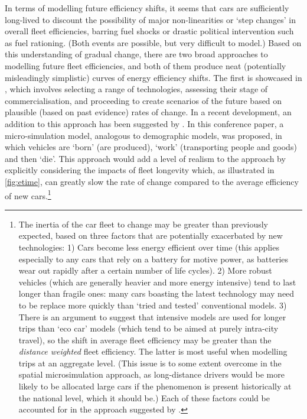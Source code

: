 In terms of modelling future efficiency shifts, it seems that cars are sufficiently
long-lived to discount the possibility of major non-linearities or
`step changes' in overall fleet efficiencies, barring fuel shocks
\citep{Lyons2002} or drastic political intervention such as fuel rationing.
(Both events are possible, but very difficult to model.)
Based on this understanding of gradual change, there
are two broad approaches to modelling future fleet efficiencies, and both
of them produce neat (potentially misleadingly simplistic) curves of energy efficiency
shifts. The first is showcased in \citet{Baptista2012}, which involves selecting
a range of technologies, assessing their stage of commercialisation, and
proceeding to create scenarios of the future based on plausible (based on
past evidence) rates of change. In a recent development, an addition to this
approach has been suggested by \citet{Zuo2013}. In this conference paper,
a micro-simulation model, analogous to demographic models, was proposed,
in which vehicles are `born' (are produced), `work' (transporting people
and goods) and then `die'. This approach would add a level of realism to
the approach by explicitly considering the impacts of fleet longevity which,
as illustrated in \cref{fig:etime}, can greatly slow the rate of change compared
to the average efficiency of new
cars.\footnote{The inertia
of the car fleet to change may be greater than previously expected,
based on three factors that are potentially exacerbated by new technologies:
1) Cars become less energy efficient over time (this applies especially to
any cars that rely on a battery for motive power, as batteries
wear out rapidly after a certain number of life cycles). 2) More robust
vehicles (which are generally heavier and more energy intensive)
tend to last longer than fragile ones: many cars boasting the latest
technology may need to be replace more quickly than `tried and tested'
conventional models. 3) There is an argument to suggest that intensive models
are used for longer trips than `eco car' models (which tend to be aimed at
purely intra-city travel), so the shift in average fleet efficiency
may be greater than the \emph{distance weighted} fleet efficiency. The latter
is most useful when modelling trips at an aggregate level.
(This issue is to some extent overcome in the spatial microsimulation
approach, as long-distance drivers would be more likely to be
allocated large cars if the phenomenon is present historically at the national
level, which it should be.) Each of these factors could be accounted for in
the approach suggested by \citet{Zuo2013}.
}

